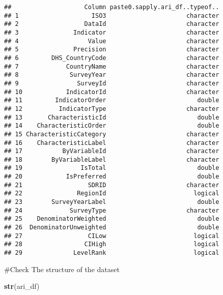 \documentclass[
]{article}
\newenvironment{Shaded}{\begin{snugshade}}{\end{snugshade}}
\newcommand{\FunctionTok}[1]{\textcolor[rgb]{0.13,0.29,0.53}{\textbf{#1}}}
\newcommand{\NormalTok}[1]{#1}
\begin{document}
\begin{verbatim}
##                    Column paste0.sapply.ari_df..typeof..
## 1                    ISO3                      character
## 2                  DataId                      character
## 3               Indicator                      character
## 4                   Value                      character
## 5               Precision                      character
## 6         DHS_CountryCode                      character
## 7             CountryName                      character
## 8              SurveyYear                      character
## 9                SurveyId                      character
## 10            IndicatorId                      character
## 11         IndicatorOrder                         double
## 12          IndicatorType                      character
## 13       CharacteristicId                         double
## 14    CharacteristicOrder                         double
## 15 CharacteristicCategory                      character
## 16    CharacteristicLabel                      character
## 17           ByVariableId                      character
## 18        ByVariableLabel                      character
## 19                IsTotal                         double
## 20            IsPreferred                         double
## 21                  SDRID                      character
## 22               RegionId                        logical
## 23        SurveyYearLabel                         double
## 24             SurveyType                      character
## 25    DenominatorWeighted                         double
## 26  DenominatorUnweighted                         double
## 27                  CILow                        logical
## 28                 CIHigh                        logical
## 29              LevelRank                        logical
\end{verbatim}

\#Check The structure of the dataset

\begin{Shaded}
\begin{Highlighting}[]
\FunctionTok{str}\NormalTok{(ari\_df)}
\end{Highlighting}
\end{Shaded}
\end{document}
